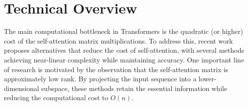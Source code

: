 \documentclass[letterpaper,twocolumn,10pt]{article}
\begin{document}
\section{Technical Overview}
\label{sec:overview}

The main computational bottleneck in Transformers is the quadratic (or higher) cost of the self-attention matrix multiplications. To address this, recent work~\cite{Linformer, Longformer, Nystromformer, Performer, A3} proposes alternatives that reduce the cost of self-attention, with several methods achieving near-linear complexity while maintaining accuracy.
One important line of research is motivated by the observation that the self-attention matrix is approximately low rank. By projecting the input sequence into a lower-dimensional subspace, these methods retain the essential information while reducing the computational cost to $O(n)$.
\end{document}
